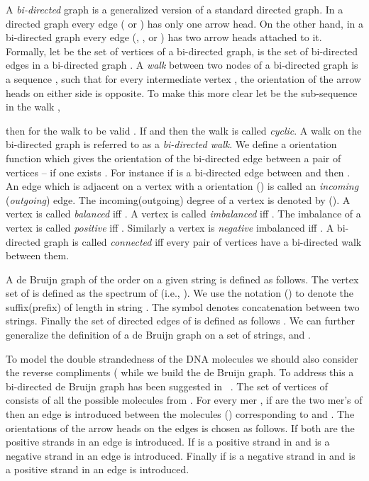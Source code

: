 \documentclass[runningheads]{llncs}
\begin{document}
A {\em bi-directed} graph is a generalized version of a standard directed graph. In a directed graph every 
edge ( or ) has only one arrow head. On the other hand, in a bi-directed graph 
every edge (, , or ) has two arrow 
heads attached to it. Formally, let  be the set of vertices of a bi-directed graph,  is the set of bi-directed edges in a bi-directed graph . 
A {\em walk}  between two nodes  of a bi-directed graph  is a
sequence , such that for 
every intermediate vertex , the orientation of the arrow heads on either side is opposite. To make this more clear let  be the sub-sequence in the walk ,

then for the walk to be valid . If  and  then the walk is called {\em cyclic}. A walk on the bi-directed graph is referred to as
a {\em bi-directed walk}. We define a orientation function  which
gives the orientation of the bi-directed edge between a pair of vertices -- if one exists . 
For instance if  is a bi-directed edge between  and  then 
. An edge which is adjacent on a vertex with a orientation 
 () is called an {\em incoming} ({\em outgoing}) edge. The incoming(outgoing) degree 
of a vertex  is denoted by  (). A vertex  is called {\em balanced}
iff . A vertex is called {\em imbalanced} 
iff . The imbalance of a vertex is called {\em positive} 
iff . Similarly a vertex is {\em negative} imbalanced iff 
. A bi-directed graph is called {\em connected} iff every pair of
vertices have a bi-directed walk between them.


A de Bruijn graph  of the order  on a given string  is defined as follows. The vertex set 
 of  is defined as the spectrum of  (i.e., ). We use the notation 
() to denote the suffix(prefix) of length  in string . The symbol  denotes 
concatenation between two strings. Finally the set of directed edges  of  is defined as follows 
. 
We can further generalize the definition of a de Bruijn graph  on a set  
of strings,  and .

To model the double strandedness of the DNA molecules we should also consider the reverse 
compliments ( while we build the de Bruijn graph. 
To address this a bi-directed de Bruijn graph  has been suggested in 
~\cite{bidirected_graph}. The set of vertices  of  consists of all the 
possible molecules from . For every mer , if  are 
the two mer's of  then an edge is introduced between the molecules () corresponding 
to  and . The orientations of the arrow heads on the edges is chosen as follows. If both  
are the positive strands in  an edge  is introduced. If  is a positive 
strand in  and  is a negative strand in  an edge  is introduced. 
Finally if  is a negative strand in  and  is a positive strand in  an 
edge  is introduced. 
\end{document}
